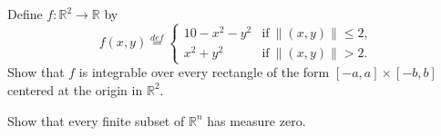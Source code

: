 \documentclass[11pt,letterpaper,cm]{nupset}
\begin{document}
\begin{problem}[Exercise 9] Define $f:\mathbb{R}^2\to\mathbb{R}$ by $$f(x,y)\stackrel{def}{=}\begin{cases} 10-x^2-y^2 & \mbox{if}\ \|(x,y)\|\leq 2,\\ x^2+y^2 & \mbox{if}\ \|(x,y)\|>2.\end{cases}$$  Show that $f$ is integrable over every rectangle of the form $[-a,a]\times[-b,b]$ centered at the origin in $\mathbb{R}^2$.
\end{problem}
\begin{solution}
	
\end{solution}

\begin{problem}[Exercise 10] Show that every finite subset of $\mathbb{R}^n$ has measure zero.
\end{problem}
\begin{solution}
	
	\end{solution}
\end{document}
